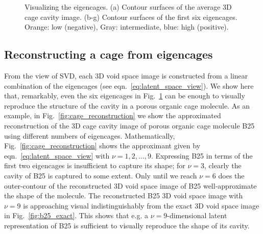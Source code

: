 \documentclass[journal=jacsat,manuscript=article,layout=traditional]{achemso}
\begin{document}
\begin{figure}
		\qquad
	\caption{Visualizing the eigencages. (a) Contour surfaces of the average 3D cage cavity image. (b-g) Contour surfaces of the first six eigencages. Orange: low (negative), Gray: intermediate, blue: high (positive).
	} \label{fig:eigencages}
\end{figure}

\subsection{Reconstructing a cage from eigencages} From the view of SVD, each 3D void space image is constructed from a linear combination of the eigencages (see eqn.~\ref{eq:latent_space_view}). We show here that, remarkably, even the six eigencages in Fig.~\ref{fig:eigencages} can be enough to visually reproduce the structure of the cavity in a porous organic cage molecule. As an example, in Fig.~\ref{fig:cage_reconstruction} we show the approximated reconstruction of the 3D cage cavity image of porous organic cage molecule B25 using different numbers of eigencages. Mathematically, Fig.~\ref{fig:cage_reconstruction} shows the approximant given by eqn.~\ref{eq:latent_space_view} with $\nu=1,2,...,9$. Expressing B25 in terms of the first two eigencages is insufficient to capture its shape; for $\nu=3$, clearly the cavity of B25 is captured to some extent. Only until we reach $\nu=6$ does the outer-contour of the reconstructed 3D void space image of B25 well-approximate the shape of the molecule. The reconstructed B25 3D void space image with $\nu=9$ is approaching visual indistinguishably from the exact 3D void space image in Fig.~\ref{fig:b25_exact}. This shows that e.g. a $\nu=9$-dimensional latent representation of B25 is sufficient to visually reproduce the shape of its cavity.
\end{document}
